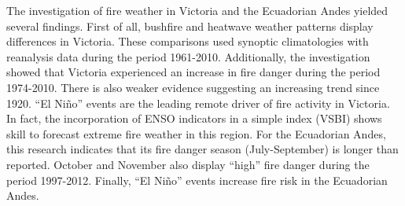 The investigation of fire weather in Victoria and the Ecuadorian Andes
yielded several findings. First of all, bushfire and heatwave weather
patterns display differences in Victoria. These comparisons used synoptic
climatologies with reanalysis data during the period 1961-2010. Additionally,
the investigation showed that Victoria experienced an increase in
fire danger during the period 1974-2010. There is also weaker evidence
suggesting an increasing trend since 1920. \textquotedblleft El
Ni\~no\textquotedblright{} events are the leading remote driver of fire
activity in Victoria. In fact, the incorporation of ENSO indicators
in a simple index (VSBI) shows skill to forecast extreme fire weather
in this region. For the Ecuadorian Andes, this research indicates
that its fire danger season (July-September) is longer than reported.
October and November also display \textquotedblleft high\textquotedblright{}
fire danger during the period 1997-2012. Finally, \textquotedblleft El
Ni\~no\textquotedblright{} events increase fire risk in the Ecuadorian
Andes. 
